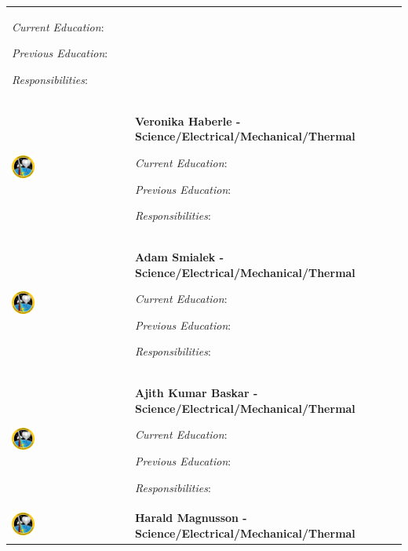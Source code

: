 \begin{longtable}[]{m{} m{}}
\smallskip
\textit{Current Education}: 

\smallskip
\textit{Previous Education}:

\smallskip
\textit{Responsibilities}:                           
\bigskip
\\
 \includegraphics[width=0.2\textwidth]{0-cover/img/logo-rexus-bexus.png}  & \textbf{Veronika Haberle - Science/Electrical/Mechanical/Thermal}

\smallskip
\textit{Current Education}: 

\smallskip
\textit{Previous Education}:

\smallskip
\textit{Responsibilities}:                           
\bigskip
\\
 \includegraphics[width=0.2\textwidth]{0-cover/img/logo-rexus-bexus.png}  & \textbf{Adam Smialek - Science/Electrical/Mechanical/Thermal}

\smallskip
\textit{Current Education}: 

\smallskip
\textit{Previous Education}:

\smallskip
\textit{Responsibilities}:                           
\bigskip
\\
 \includegraphics[width=0.2\textwidth]{0-cover/img/logo-rexus-bexus.png}  & \textbf{Ajith Kumar Baskar - Science/Electrical/Mechanical/Thermal}

\smallskip
\textit{Current Education}: 

\smallskip
\textit{Previous Education}:

\smallskip
\textit{Responsibilities}:                           
\bigskip
\\
 \includegraphics[width=0.2\textwidth]{0-cover/img/logo-rexus-bexus.png}  & \textbf{Harald Magnusson - Science/Electrical/Mechanical/Thermal}


\end{longtable}
